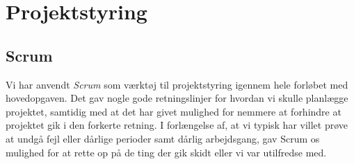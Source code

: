 \section{Projektstyring}
\subsection{Scrum}
Vi har anvendt \textit{Scrum} som værktøj til projektstyring igennem hele forløbet med hovedopgaven.
Det gav nogle gode retningslinjer for hvordan vi skulle planlægge projektet, samtidig med at det har givet mulighed for nemmere at forhindre at projektet gik i den forkerte retning.
I forlængelse af, at vi typisk har villet prøve at undgå fejl eller dårlige perioder samt dårlig arbejdsgang, gav Scrum os mulighed for
at rette op på de ting der gik skidt eller vi var utilfredse med.

